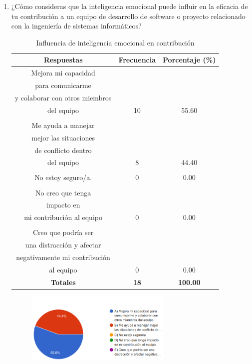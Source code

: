 \documentclass[journal]{IEEEtran}
\begin{document}
\begin{enumerate}
\item¿Cómo consideras que la inteligencia emocional puede influir en la eficacia de tu contribución a un equipo de desarrollo de software o proyecto relacionado con la ingeniería de sistemas informáticos?
	\begin{table}[H]
		\renewcommand{\arraystretch}{1.3}
		\centering
		\caption{Influencia de inteligencia emocional en contribución}
		\begin{tabular}{c c c}
			\hline
			\textbf{Respuestas} & \textbf{Frecuencia} & \textbf{Porcentaje (\%)}\\
			\hline
			Mejora mi capacidad \\para comunicarme\\ y colaborar con otros miembros\\ del equipo & 10 & 55.60 \\
			\\Me ayuda a manejar \\mejor las situaciones\\ de conflicto dentro \\del equipo & 8 & 44.40 \\
			\\No estoy seguro/a. & 0 & 0.00\\
			\\No creo que tenga \\impacto en \\mi contribución al equipo & 0 & 0.00\\
			\\Creo que podría ser\\ una distracción y afectar\\ negativamente mi contribución \\al equipo & 0 & 0.00\\
			\hline
			\textbf{Totales} &\textbf{18}& \textbf{100.00}\\
			\hline
		\end{tabular}
	\end{table}
	\begin{figure}[h]
		\centering
		\includegraphics[width=07cm]{Pregunta 9}
	\end{figure}

\end{enumerate}
\end{document}
